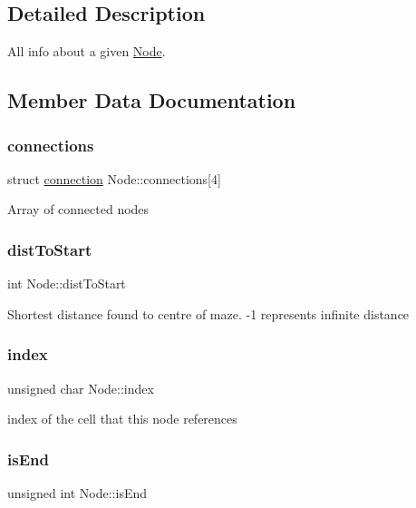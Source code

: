 \subsection{Detailed Description}
All info about a given \hyperlink{structNode}{Node}. 

\subsection{Member Data Documentation}
\mbox{\label{structNode_a1552d162ffa511bd47eb78cfe89240d1}} 
\subsubsection{\texorpdfstring{connections}{connections}}
{\footnotesize\ttfamily struct \hyperlink{structconnection}{connection} Node\+::connections\mbox{[}4\mbox{]}}

Array of connected nodes \mbox{\label{structNode_ae66c167e6d151204d510f418a81f4afc}} 
\subsubsection{\texorpdfstring{dist\+To\+Start}{distToStart}}
{\footnotesize\ttfamily int Node\+::dist\+To\+Start}

Shortest distance found to centre of maze. -\/1 represents infinite distance \mbox{\label{structNode_a77c45b2ff49ea5dc4195fed43e7787c2}} 
\subsubsection{\texorpdfstring{index}{index}}
{\footnotesize\ttfamily unsigned char Node\+::index}

index of the cell that this node references \mbox{\label{structNode_abc8ade5cf38b553b33542473c104272a}} 
\subsubsection{\texorpdfstring{is\+End}{isEnd}}
{\footnotesize\ttfamily unsigned int Node\+::is\+End}

